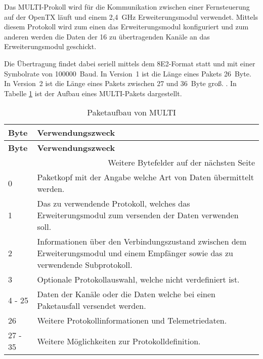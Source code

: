 Das MULTI-Prokoll wird für die Kommunikation zwischen einer Fernsteuerung auf der OpenTX läuft und einem 2,4~GHz Erweiterungsmodul verwendet. Mittels diesem Protokoll wird zum einen das Erweiterungsmodul konfiguriert und zum anderen werden die Daten der 16 zu übertragenden Kanäle an das Erweiterungsmodul geschickt. \cites{langerTransmitter}{langerMultiprotocol}

Die Übertragung findet dabei seriell mittels dem 8E2-Format statt und mit einer Symbolrate von 100000~Baud. In Version~1 ist die Länge eines Pakets 26~Byte. In Version~2 ist die Länge eines Pakets zwischen 27 und 36~Byte groß. \cite{langerMultiprotocol}. In Tabelle \ref{table:mutliPaket} ist der Aufbau eines MULTI-Pakets dargestellt.

\begin{longtable}[c]{|p{2cm}|p{13cm}|}
    \caption{Paketaufbau von MULTI \cite{langerMultiprotocol}}
    \label{table:mutliPaket}\\
    \hline
    \textbf{Byte} & \textbf{Verwendungszweck}\\
    \hline
    \hline
    \endfirsthead

    \hline
    \textbf{Byte} & \textbf{Verwendungszweck}\\
    \hline
    \hline
    \endhead

    \hline
    \multicolumn{2}{|r|}{Weitere Bytefelder auf der nächsten Seite}\\
    \hline
    \endfoot

    \hline
    \endlastfoot
    
    0 & Paketkopf mit der Angabe welche Art von Daten übermittelt werden. \\
    \hline
    1 & Das zu verwendende Protokoll, welches das Erweiterungsmodul zum versenden der Daten verwenden soll. \\
    \hline
    2 & Informationen über den Verbindungszustand zwischen dem Erweiterungsmodul und einem Empfänger sowie das zu verwendende Subprotokoll. \\
    \hline
    3 & Optionale Protokollauswahl, welche nicht verdefiniert ist. \\
    \hline
    4 - 25 & Daten der Kanäle oder die Daten welche bei einen Paketausfall versendet werden. \\
    \hline
    26 & Weitere Protokollinformationen und Telemetriedaten. \\
    \hline
    27 - 35 & Weitere Möglichkeiten zur Protokolldefinition. \\
\end{longtable}

